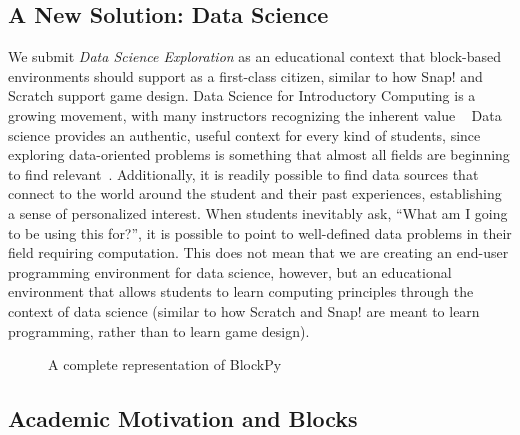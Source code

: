 \documentclass{sig-alternate}
\begin{document}
\subsection{A New Solution: Data Science}

We submit \textit{Data Science Exploration} as an educational context that block-based environments should support as a first-class citizen, similar to how Snap! and Scratch support game design.
Data Science for Introductory Computing is a growing movement, with many instructors recognizing the inherent value ~\cite{Anderson, Sullivan:2013}
Data science provides an authentic, useful context for every kind of students, since exploring data-oriented problems is something that almost all fields are beginning to find relevant~\cite{Layman:2007, Social-good}.
Additionally, it is readily possible to find data sources that connect to the world around the student and their past experiences, establishing a sense of personalized interest.
When students inevitably ask, ``What am I going to be using this for?'', it is possible to point to well-defined data problems in their field requiring computation.
This does not mean that we are creating an end-user programming environment for data science, however, but an educational environment that allows students to learn computing principles through the context of data science (similar to how Scratch and Snap! are meant to learn programming, rather than to learn game design).

\begin{figure*}[t]
\caption{A complete representation of BlockPy}
\label{fig-blockpy-full}
\end{figure*}

\subsection{Academic Motivation and Blocks}
\end{document}
